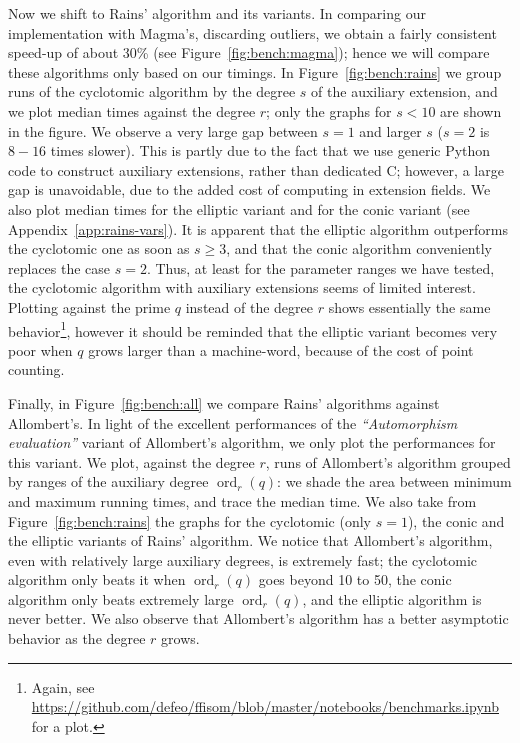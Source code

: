 \documentclass{mcom-l}
\theoremstyle{plain}
\theoremstyle{definition}
\DeclareMathOperator{\order}{ord} %
\newcounter{algorithm}
\begin{document}
Now we shift to Rains' algorithm and its variants. %
In comparing our implementation with Magma's, discarding outliers, we
obtain a fairly consistent speed-up of about 30\% (see
Figure~\ref{fig:bench:magma}); hence we will compare these algorithms
only based on our timings. %
In Figure~\ref{fig:bench:rains} we group runs of the cyclotomic
algorithm by the degree $s$ of the auxiliary extension, and we plot
median times against the degree $r$; only the graphs for $s<10$ are
shown in the figure. %
We observe a very large gap between $s=1$ and larger $s$ ($s=2$ is
$8-16$ times slower). This is partly due to the fact that we use
generic Python code to construct auxiliary extensions, rather than
dedicated C; however, a large gap is unavoidable, due to the added
cost of computing in extension fields. %
We also plot median times for the elliptic variant and for the conic
variant (see Appendix~\ref{app:rains-vars}). %
It is apparent that the elliptic algorithm outperforms the cyclotomic
one as soon as $s\ge 3$, and that the conic algorithm conveniently
replaces the case $s=2$. %
Thus, at least for the parameter ranges we have tested, the cyclotomic
algorithm with auxiliary extensions seems of limited interest. %
Plotting against the prime $q$ instead of the degree $r$ shows
essentially the same behavior\footnote{Again, see
  \url{https://github.com/defeo/ffisom/blob/master/notebooks/benchmarks.ipynb}
  for a plot.}, however it should be reminded that the elliptic
variant becomes very poor when $q$ grows larger than a machine-word,
because of the cost of point counting.

Finally, in Figure~\ref{fig:bench:all} we compare Rains' algorithms
against Allombert's. %
In light of the excellent performances of the \emph{``Automorphism
  evaluation''} variant of Allombert's algorithm, we only plot the
performances for this variant. %
We plot, against the degree $r$, runs of Allombert's algorithm grouped
by ranges of the auxiliary degree $\order_r(q)$: we shade the area
between minimum and maximum running times, and trace the median
time. %
We also take from Figure~\ref{fig:bench:rains} the graphs for the
cyclotomic (only $s=1$), the conic and the elliptic variants of Rains'
algorithm. %
We notice that Allombert's algorithm, even with relatively large
auxiliary degrees, is extremely fast; the cyclotomic algorithm only
beats it when $\order_r(q)$ goes beyond 10 to 50, the conic algorithm
only beats extremely large $\order_r(q)$, and the elliptic algorithm
is never better. %
We also observe that Allombert's algorithm has a better asymptotic
behavior as the degree $r$ grows.
\end{document}
